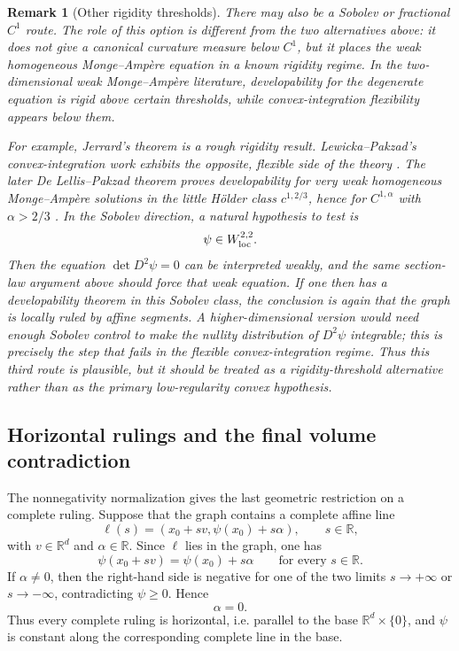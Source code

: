 \documentclass[11pt]{amsart}
\def\R{\mathbb{R}}
\newtheorem{remark}[theorem]{Remark}
\begin{document}
\begin{remark}[Other rigidity thresholds]
There may also be a Sobolev or fractional $C^1$ route.  The role of this
option is different from the two alternatives above: it does not give a
canonical curvature measure below $C^1$, but it places the weak homogeneous
Monge--Ampère equation in a known rigidity regime.  In the two-dimensional weak
Monge--Ampère literature, developability for the degenerate equation is rigid
above certain thresholds, while convex-integration flexibility appears below
them.

For example, Jerrard's theorem is a rough rigidity result.  Lewicka--Pakzad's
convex-integration work exhibits the opposite, flexible side of the theory
\cite{LP17}.  The later De Lellis--Pakzad theorem proves developability for
very weak homogeneous Monge--Ampère solutions in the little Hölder class
$c^{1,2/3}$, hence for $C^{1,\alpha}$ with $\alpha>2/3$ \cite{DLP24}.  In the
Sobolev direction, a natural hypothesis to test is
\[
    \psi\in W^{2,2}_{\rm loc}.
\]
Then the equation $\det D^2\psi=0$ can be interpreted weakly, and the same
section-law argument above should force that weak equation.  If one then has a
developability theorem in this Sobolev class, the conclusion is again that the
graph is locally ruled by affine segments.  A higher-dimensional version would
need enough Sobolev control to make the nullity distribution of $D^2\psi$
integrable; this is precisely the step that fails in the flexible
convex-integration regime.  Thus this third route is plausible, but it should
be treated as a rigidity-threshold alternative rather than as the primary
low-regularity convex hypothesis.
\end{remark}

\subsection{Horizontal rulings and the final volume contradiction}
The nonnegativity normalization gives the last geometric restriction on a
complete ruling.  Suppose that the graph contains a complete affine line
\[
    \ell(s)=(x_0+s v,\psi(x_0)+s\alpha),\qquad s\in\R,
\]
with $v\in\R^d$ and $\alpha\in\R$.  Since $\ell$ lies in the graph, one has
\[
    \psi(x_0+s v)=\psi(x_0)+s\alpha
    \qquad\text{for every }s\in\R.
\]
If $\alpha\neq0$, then the right-hand side is negative for one of the two
limits $s\to+\infty$ or $s\to-\infty$, contradicting $\psi\geq0$.  Hence
\[
    \alpha=0.
\]
Thus every complete ruling is horizontal, i.e. parallel to the base
$\R^d\times\{0\}$, and $\psi$ is constant along the corresponding complete
line in the base.
\end{document}
